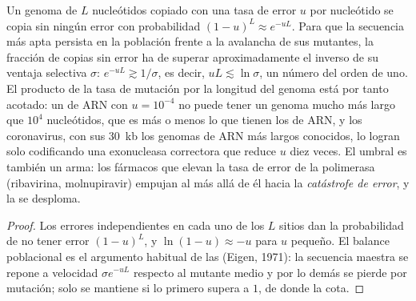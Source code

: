 \begin{proposition}\label{prop:b3:virology:error-threshold}
Un genoma de $L$ nucleótidos copiado con una tasa de error $u$ por
nucleótido se copia sin ningún error con probabilidad
$(1-u)^{L} \approx e^{-uL}$. Para que la secuencia más apta persista en
la población frente a la avalancha de sus mutantes, la fracción de copias
sin error ha de superar aproximadamente el inverso de su ventaja
selectiva $\sigma$: $e^{-uL} \gtrsim
1/\sigma$, es decir, $uL \lesssim \ln\sigma$, un número del orden de uno.
El producto de la tasa de mutación por la longitud del genoma está por
tanto acotado: un  de ARN con $u = 10^{-4}$ no puede tener un genoma
mucho más largo que $10^{4}$ nucleótidos, que es más o menos lo que
tienen los  de ARN, y los coronavirus, con sus \qty{30}{kb} los
genomas de ARN más largos conocidos, lo logran solo codificando una
exonucleasa correctora que reduce $u$ diez veces. El umbral es también un
arma: los fármacos que elevan la tasa de error de la polimerasa
(ribavirina, molnupiravir) empujan al  más allá de él hacia la
\emph{catástrofe de error}, y la  se desploma.
\end{proposition}
\begin{proof}
Los errores independientes en cada uno de los $L$ sitios dan la
probabilidad de no tener error $(1-u)^{L}$, y $\ln(1-u) \approx -u$ para
$u$ pequeño. El balance poblacional es el argumento habitual de las
 (Eigen, 1971): la secuencia maestra se repone a velocidad
$\sigma e^{-uL}$ respecto al mutante medio y por lo demás se pierde por
mutación; solo se mantiene si lo primero supera a $1$, de donde la cota.
\end{proof}

